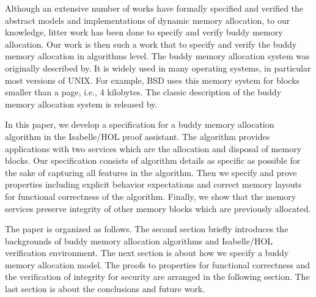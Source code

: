 Although an extensive number of works have formally specified and verified the abstract models and implementations of dynamic memory allocation, to our knowledge, litter work has been done to specify and verify buddy memory allocation. Our work is then such a work that to specify and verify the buddy memory allocation in algorithms level. The buddy memory allocation system was originally described by\cite{reg_knowlton}. It is widely used in many operating systems, in particular most versions of UNIX. For example, BSD\cite{reg_mckusick} uses this memory system for blocks smaller than a page, i.e., 4 kilobytes. The classic description of the buddy memory allocation system is released by\cite{reg_knuth}.

In this paper, we develop a specification for a buddy memory allocation algorithm in the Isabelle/HOL proof assistant. The algorithm provides applications with two services which are the allocation and disposal of memory blocks. Our specification consists of algorithm details as specific as possible for the sake of capturing all features in the algorithm. Then we specify and prove properties including explicit behavior expectations and correct memory layouts for functional correctness of the algorithm. Finally, we show that the memory services preserve integrity of other memory blocks which are previously allocated.

The paper is organized as follows. The second section briefly introduces the backgrounds of buddy memory allocation algorithms and Isabelle/HOL verification environment. The next section is about how we specify a buddy memory allocation model. The proofs to properties for functional correctness and the verification of integrity for security are arranged in the following section. The last section is about the conclusions and future work.
